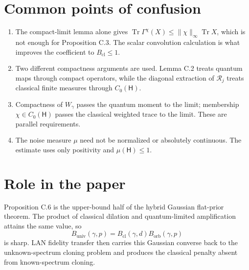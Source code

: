 \documentclass[11pt]{article}
\newcommand{\Hc}{\mathsf H}
\newcommand{\Tr}{\operatorname{Tr}}
\newcommand{\Bcl}{B_{\mathrm{cl}}}
\newcommand{\Borb}{B_{\mathrm{orb}}}
\newcommand{\Buniv}{B_{\mathrm{univ}}}
\begin{document}
\section{Common points of confusion}

\begin{enumerate}
  \item The compact-limit lemma alone gives
  $\Tr\Gamma^\chi(X)\leq\|\chi\|_\infty\Tr X$, which is not enough for
  Proposition C.3.  The scalar convolution calculation is what improves the
  coefficient to $\Bcl\leq1$.
  \item Two different compactness arguments are used.  Lemma C.2 treats
  quantum maps through compact operators, while the diagonal extraction of
  $\mathcal R_j$ treats classical finite measures through $C_0(\Hc)$.
  \item Compactness of $W_\gamma$ passes the quantum moment to the limit;
  membership $\chi\in C_0(\Hc)$ passes the classical weighted trace to the
  limit.  These are parallel requirements.
  \item The noise measure $\mu$ need not be normalized or absolutely
  continuous.  The estimate uses only positivity and
  $\mu(\Hc)\leq1$.
\end{enumerate}

\section{Role in the paper}

Proposition C.6 is the upper-bound half of the hybrid Gaussian flat-prior
theorem.  The product of classical dilation and quantum-limited amplification
attains the same value, so
\[
  \Buniv(\gamma,p)
  =\Bcl(\gamma,d)\Borb(\gamma,p)
\]
is sharp.  LAN fidelity transfer then carries this Gaussian converse back to
the unknown-spectrum cloning problem and produces the classical penalty
absent from known-spectrum cloning.
\end{document}
